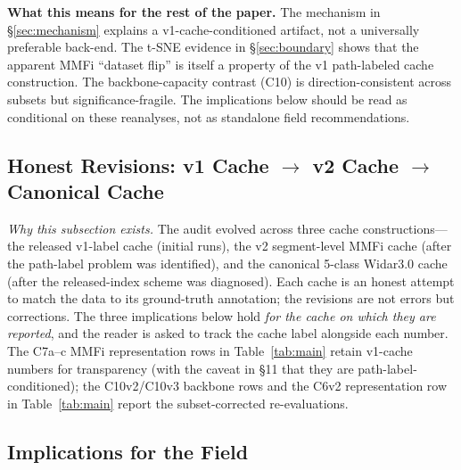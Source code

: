 \documentclass[11pt]{article}
\theoremstyle{definition}
\begin{document}
\textbf{What this means for the rest of the paper.} The mechanism in \S\ref{sec:mechanism} explains a v1-cache-conditioned artifact, not a universally preferable back-end. The t-SNE evidence in \S\ref{sec:boundary} shows that the apparent MMFi ``dataset flip'' is itself a property of the v1 path-labeled cache construction. The backbone-capacity contrast (C10) is direction-consistent across subsets but significance-fragile. The implications below should be read as conditional on these reanalyses, not as standalone field recommendations.

\subsection{Honest Revisions: v1 Cache $\to$ v2 Cache $\to$ Canonical Cache}
\label{sec:discussion-revisions}

\emph{Why this subsection exists.} The audit evolved across three cache constructions---the released v1-label cache (initial runs), the v2 segment-level MMFi cache (after the path-label problem was identified), and the canonical 5-class Widar3.0 cache (after the released-index scheme was diagnosed). Each cache is an honest attempt to match the data to its ground-truth annotation; the revisions are not errors but corrections. The three implications below hold \emph{for the cache on which they are reported}, and the reader is asked to track the cache label alongside each number. The C7a--c MMFi representation rows in Table~\ref{tab:main} retain v1-cache numbers for transparency (with the caveat in §11 that they are path-label-conditioned); the C10v2/C10v3 backbone rows and the C6v2 representation row in Table~\ref{tab:main} report the subset-corrected re-evaluations.

\subsection{Implications for the Field}
\end{document}
